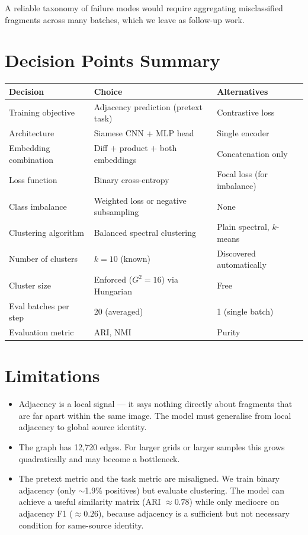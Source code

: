 \documentclass[12pt, a4paper]{article}
\begin{document}
A reliable taxonomy of failure modes would require aggregating misclassified
fragments across many batches, which we leave as follow-up work.

\section{Decision Points Summary}

\begin{center}
\begin{tabular}{lll}
\toprule
\textbf{Decision} & \textbf{Choice} & \textbf{Alternatives} \\
\midrule
Training objective & Adjacency prediction (pretext task) & Contrastive loss \\
Architecture & Siamese CNN + MLP head & Single encoder \\
Embedding combination & Diff $+$ product $+$ both embeddings & Concatenation only \\
Loss function & Binary cross-entropy & Focal loss (for imbalance) \\
Class imbalance & Weighted loss or negative subsampling & None \\
Clustering algorithm & Balanced spectral clustering & Plain spectral, $k$-means \\
Number of clusters & $k = 10$ (known) & Discovered automatically \\
Cluster size & Enforced ($G^2 = 16$) via Hungarian & Free \\
Eval batches per step & 20 (averaged) & 1 (single batch) \\
Evaluation metric & ARI, NMI & Purity \\
\bottomrule
\end{tabular}
\end{center}

\section{Limitations}

\begin{itemize}
    \item Adjacency is a local signal — it says nothing directly about fragments that are
          far apart within the same image. The model must generalise from local adjacency
          to global source identity.
    \item The graph has 12,720 edges. For larger grids or larger samples this grows
          quadratically and may become a bottleneck.
    \item The pretext metric and the task metric are misaligned. We train binary
          adjacency (only $\sim$1.9\% positives) but evaluate clustering. The model can
          achieve a useful similarity matrix (ARI $\approx 0.78$) while only mediocre
          on adjacency F1 ($\approx 0.26$), because adjacency is a sufficient but not
          necessary condition for same-source identity.
\end{itemize}
\end{document}
